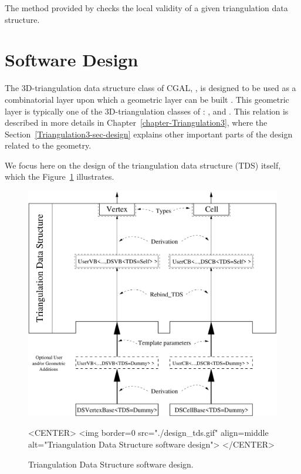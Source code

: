 The  method provided by
 checks the local validity of a
given triangulation data structure.
 
\section{Software Design}
\label{TDS3-sec-design}

The 3D-triangulation data structure class of CGAL,
, is designed to be used as a combinatorial
layer upon which a geometric layer can be built \cite{k-ddsps-98}. This
geometric layer is typically one of the 3D-triangulation classes of \cgal:
,  and
. This relation is described in more details in
Chapter~\ref{chapter-Triangulation3}, where the
Section~\ref{Triangulation3-sec-design} explains other important parts of the
design related to the geometry.

We focus here on the design of the triangulation data structure (TDS)
itself, which the Figure~\ref{TDS3-fig-layers} illustrates.

\begin{figure}[htbp]
\begin{ccTexOnly}
\begin{center}
\includegraphics[width=14cm]{TriangulationDS_3/design_tds}
\end{center}
\end{ccTexOnly}
\begin{ccHtmlOnly}
<CENTER>
<img border=0 src="./design_tds.gif" align=middle
 alt="Triangulation Data Structure software design">
</CENTER>
\end{ccHtmlOnly}
\caption{Triangulation Data Structure software design.
\label{TDS3-fig-layers}}
\end{figure} 

